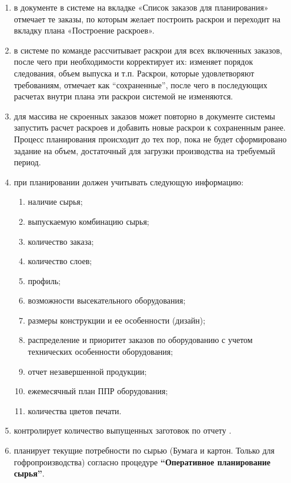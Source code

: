 \begin{enumerate}
\item \planner в документе  в системе \gofro на вкладке «Список заказов для планирования»  отмечает те заказы, по которым желает построить раскрои и переходит на вкладку плана «Построение раскроев».
\item \planner в системе \gofro по команде  рассчитывает раскрои для всех включенных заказов, после чего \planner при необходимости корректирует их: изменяет порядок следования, объем выпуска и т.п. Раскрои, которые удовлетворяют требованиям, \planner отмечает как “сохраненные”, после чего в последующих расчетах внутри плана эти раскрои системой \gofro не изменяются.
\item	 \planner для массива не скроенных заказов может повторно в документе  системы \gofro запустить расчет раскроев и добавить новые раскрои к сохраненным ранее. Процесс планирования происходит до тех пор, пока не будет сформировано задание на объем, достаточный для загрузки производства на требуемый период.
\item	\planner при планировании  должен учитывать следующую информацию:
\begin{enumerate}
    \item наличие сырья;
    \item выпускаемую комбинацию сырья;
    \item количество заказа;
    \item количество слоев;
    \item профиль;
    \item возможности высекательного оборудования;
    \item размеры конструкции и ее особенности (дизайн);
    \item распределение и приоритет заказов по оборудованию с учетом технических особенности оборудования;
    \item отчет незавершенной продукции;
    \item ежемесячный план ППР оборудования;
    \item количества цветов печати.
\end{enumerate}
\item	\planner контролирует количество выпущенных заготовок по отчету .
\item	\planner планирует текущие потребности по сырью (Бумага и картон. Только для гофропроизводства) согласно процедуре \textbf{“Оперативное планирование сырья”}.

\end{enumerate}
